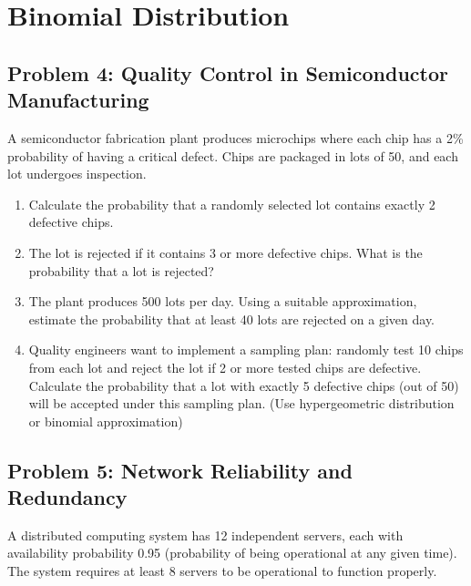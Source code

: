 \documentclass[12pt]{article}
\begin{document}

\section{Binomial Distribution}

\subsection*{Problem 4: Quality Control in Semiconductor Manufacturing}

A semiconductor fabrication plant produces microchips where each chip has a 2\% probability of having a critical defect. Chips are packaged in lots of 50, and each lot undergoes inspection.

\begin{enumerate}[label=(\alph*)]
\item Calculate the probability that a randomly selected lot contains exactly 2 defective chips.

\item The lot is rejected if it contains 3 or more defective chips. What is the probability that a lot is rejected?

\item The plant produces 500 lots per day. Using a suitable approximation, estimate the probability that at least 40 lots are rejected on a given day.

\item Quality engineers want to implement a sampling plan: randomly test 10 chips from each lot and reject the lot if 2 or more tested chips are defective. Calculate the probability that a lot with exactly 5 defective chips (out of 50) will be accepted under this sampling plan. (Use hypergeometric distribution or binomial approximation)
\end{enumerate}

\subsection*{Problem 5: Network Reliability and Redundancy}

A distributed computing system has 12 independent servers, each with availability probability 0.95 (probability of being operational at any given time). The system requires at least 8 servers to be operational to function properly.
\end{document}

